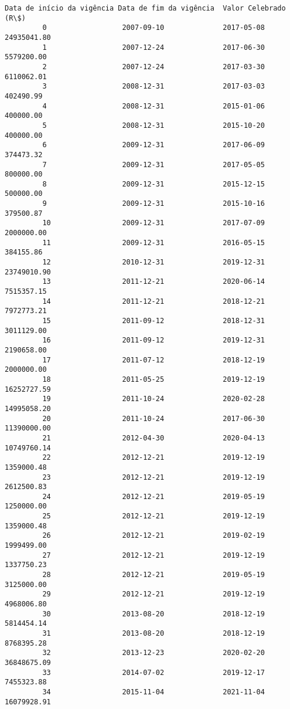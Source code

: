 \documentclass[11pt]{article}
\begin{document}
\begin{Verbatim}[commandchars=\\\{\}]
            Data de início da vigência Data de fim da vigência  Valor Celebrado (R\$)  
         0                  2007-09-10              2017-05-08           24935041.80  
         1                  2007-12-24              2017-06-30            5579200.00  
         2                  2007-12-24              2017-03-30            6110062.01  
         3                  2008-12-31              2017-03-03             402490.99  
         4                  2008-12-31              2015-01-06             400000.00  
         5                  2008-12-31              2015-10-20             400000.00  
         6                  2009-12-31              2017-06-09             374473.32  
         7                  2009-12-31              2017-05-05             800000.00  
         8                  2009-12-31              2015-12-15             500000.00  
         9                  2009-12-31              2015-10-16             379500.87  
         10                 2009-12-31              2017-07-09            2000000.00  
         11                 2009-12-31              2016-05-15             384155.86  
         12                 2010-12-31              2019-12-31           23749010.90  
         13                 2011-12-21              2020-06-14            7515357.15  
         14                 2011-12-21              2018-12-21            7972773.21  
         15                 2011-09-12              2018-12-31            3011129.00  
         16                 2011-09-12              2019-12-31            2190658.00  
         17                 2011-07-12              2018-12-19            2000000.00  
         18                 2011-05-25              2019-12-19           16252727.59  
         19                 2011-10-24              2020-02-28           14995058.20  
         20                 2011-10-24              2017-06-30           11390000.00  
         21                 2012-04-30              2020-04-13           10749760.14  
         22                 2012-12-21              2019-12-19            1359000.48  
         23                 2012-12-21              2019-12-19            2612500.83  
         24                 2012-12-21              2019-05-19            1250000.00  
         25                 2012-12-21              2019-12-19            1359000.48  
         26                 2012-12-21              2019-02-19            1999499.00  
         27                 2012-12-21              2019-12-19            1337750.23  
         28                 2012-12-21              2019-05-19            3125000.00  
         29                 2012-12-21              2019-12-19            4968006.80  
         30                 2013-08-20              2018-12-19            5814454.14  
         31                 2013-08-20              2018-12-19            8768395.28  
         32                 2013-12-23              2020-02-20           36848675.09  
         33                 2014-07-02              2019-12-17            7455323.88  
         34                 2015-11-04              2021-11-04           16079928.91  
\end{Verbatim}
            

    
    
    
    
\end{document}
